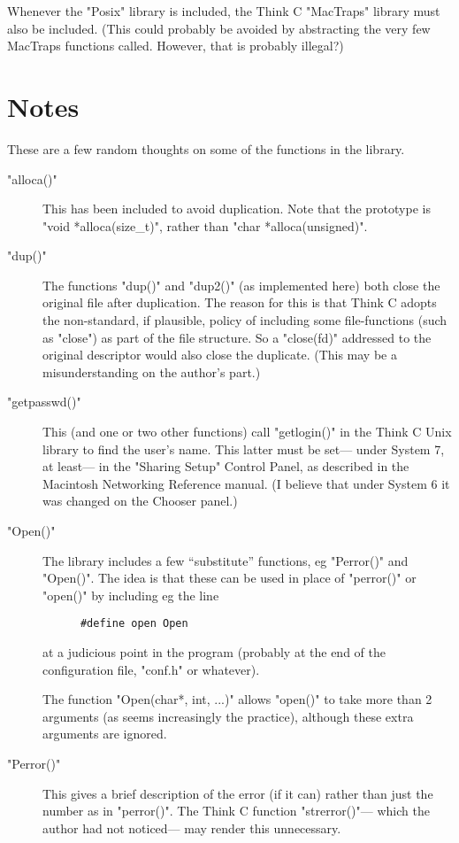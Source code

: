 Whenever the "Posix" library is included,
the Think C "MacTraps" library must also be included.
(This could probably be avoided by abstracting
the very few MacTraps functions called.
However, that is probably illegal?)

\section{Notes}
These are a few random thoughts on some of the functions
in the library.

\begin{description}

\item["alloca()"]
This has been included to avoid duplication.
Note that the prototype is "void *alloca(size_t)",
rather than "char *alloca(unsigned)".

\item["dup()"]
The functions "dup()" and "dup2()"
(as implemented here)
both close the original file after duplication.
The reason for this is that Think C adopts the non-standard,
if plausible, policy of including some file-functions
(such as "close")
as part of the file structure.
So a "close(fd)" addressed to the original descriptor
would also close the duplicate.
(This may be a misunderstanding on the author's part.)

\item["getpasswd()"]
This (and one or two other functions)
call "getlogin()" in the Think C Unix library
to find the user's name.
This latter must be set---%
under System 7, at least---%
in the "Sharing Setup" Control Panel,
as described in the Macintosh Networking Reference manual.
(I believe that under System 6 it was changed
on the Chooser panel.)

\item["Open()"]
The library includes a few ``substitute'' functions,
eg "Perror()" and "Open()".
The idea is that these can be used in place of
"perror()" or "open()" by including eg the line
\begin{verbatim}
      #define open Open
\end{verbatim}
at a judicious point in the program
(probably at the end of the configuration file,
"conf.h" or whatever).

The function "Open(char*, int, ...)"
allows "open()" to take more than 2 arguments
(as seems increasingly the practice),
although these extra arguments are ignored.

\item["Perror()"]
This gives a brief description of the error (if it can)
rather than just the number as in "perror()".
The Think C function "strerror()"---%
which the author had not noticed---%
may render this unnecessary.

\end{description}


